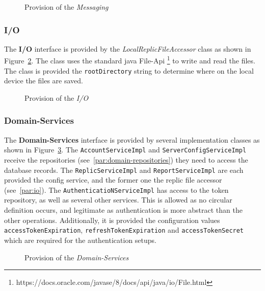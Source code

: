 \begin{figure}
    \centering

    \caption{Provision of the \textit{Messaging}}
    \label{fig:domain-messaging-p}
\end{figure}

\subsubsection{I/O}
The \textbf{I/O} interface is provided by the \textit{LocalReplicFileAccessor} class as shown in Figure~\ref{fig:domain-io-p}.
The class uses the standard java File-Api \footnote{https://docs.oracle.com/javase/8/docs/api/java/io/File.html} to write and read the files.
The class is provided the \texttt{rootDirectory} string to determine where on the local device the files are saved.

\begin{figure}
    \centering

    \caption{Provision of the \textit{I/O}}
    \label{fig:domain-io-p}
\end{figure}

\subsubsection{Domain-Services}
The \textbf{Domain-Services} interface is provided by several implementation classes as shown in Figure~\ref{fig:domain-services-p}. \newline
The \texttt{AccountServiceImpl} and \texttt{ServerConfigServiceImpl} receive the repositories (see~\ref{par:domain-repositories}) they need to access the database records. \newline
The \texttt{ReplicServiceImpl} and \texttt{ReportServiceImpl} are each provided the config service, and the former one the replic file accessor (see~\ref{par:io}). \newline
The \texttt{AuthenticatioNServiceImpl} has access to the token repository, as well as several other services.
This is allowed as no circular definition occurs, and legitimate as authentication is more abstract than the other operations.
Additionally, it is provided the configuration values \texttt{accessTokenExpiration}, \texttt{refreshTokenExpiration} and \texttt{accessTokenSecret} which are required for the authentication setups.

\begin{figure}
    \centering

    \caption{Provision of the \textit{Domain-Services}}
    \label{fig:domain-services-p}
\end{figure}

